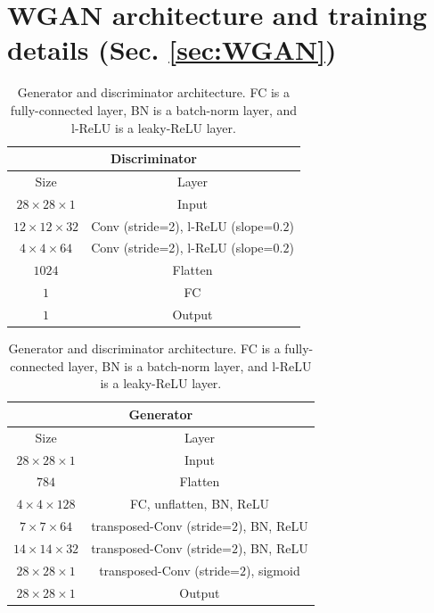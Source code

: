 \section{WGAN architecture and training details (Sec. \ref{sec:WGAN})}\label{ap:WGANdetails}
\begin{table}
	\centering
	\caption{Generator and discriminator architecture. FC is a fully-connected layer, BN is a batch-norm layer, and l-ReLU is a leaky-ReLU layer.}\label{tab:WGAN}
	\begin{tabular}[t]{|c|c|}
		\hline
		\multicolumn{2}{c}{Discriminator} \\
		\hline
		Size & Layer\\
		\hline \hline
		$28 \times 28 \times 1$ & Input  \\
		\hline
		$12 \times 12 \times 32$ & Conv (stride=2), l-ReLU (slope=$0.2$) \\
		\hline
		$4 \times 4 \times 64$ & Conv (stride=2), l-ReLU (slope=$0.2$) \\
		\hline
		$1024$ & Flatten\\
		\hline
		$1$ & FC\\
		\hline
		$1$ & Output\\
		\hline
	\end{tabular}
	\quad\quad\quad
	\begin{tabular}[t]{|c|c|}
		\hline
		\multicolumn{2}{c}{Generator} \\
		\hline
		Size & Layer\\
		\hline \hline
		$28 \times 28 \times 1$ & Input  \\
		\hline
		$784$ & Flatten \\
		\hline
		$4 \times 4 \times 128$ & FC, unflatten, BN, ReLU \\
		\hline
		$7 \times 7 \times 64$ & transposed-Conv (stride=$2$), BN, ReLU \\
		\hline
		$14 \times 14 \times 32$ & transposed-Conv (stride=$2$), BN, ReLU \\
		\hline
		$28 \times 28 \times 1$ & transposed-Conv (stride=$2$), sigmoid\\
		\hline
		$28 \times 28 \times 1$ & Output\\
		\hline
	\end{tabular}	
\end{table}

